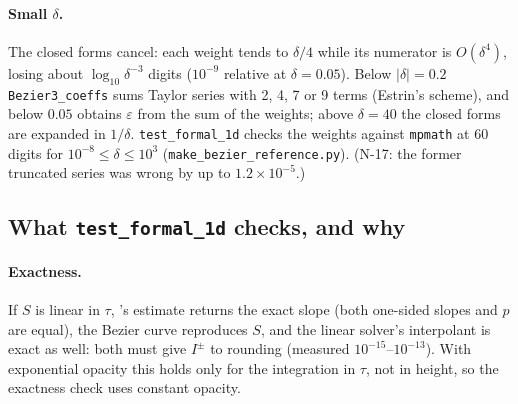 \documentclass[11pt,a4paper]{article}
\newcommand{\code}[1]{\texttt{#1}}
\begin{document}
\paragraph{Small $\delta$.} The closed forms cancel: each weight tends
to $\delta/4$ while its numerator is $O(\delta^4)$, losing about
$\log_{10}\delta^{-3}$ digits ($10^{-9}$ relative at $\delta=0.05$).
Below $|\delta| = 0.2$ \code{Bezier3\_coeffs} sums Taylor series with
2, 4, 7 or 9 terms (Estrin's scheme), and below $0.05$ obtains
$\varepsilon$ from the sum of the weights; above $\delta=40$ the closed
forms are expanded in $1/\delta$. \code{test\_formal\_1d} checks the
weights against \code{mpmath} at 60 digits for
$10^{-8}\le\delta\le10^3$ (\code{make\_bezier\_reference.py}). (N-17:
the former truncated series was wrong by up to $1.2\times10^{-5}$.)

\subsection{What \code{test\_formal\_1d} checks, and why}
\paragraph{Exactness.} If $S$ is linear in $\tau$, \citeauthor{1990A&A...239..443S}'s estimate
returns the exact slope (both one-sided slopes and $p$ are equal), the
Bezier curve reproduces $S$, and the linear solver's interpolant is
exact as well: both must give $I^\pm$ to rounding (measured
$10^{-15}$--$10^{-13}$). With exponential opacity this holds only for the
integration in $\tau$, not in height, so the exactness check uses
constant opacity.
\end{document}
